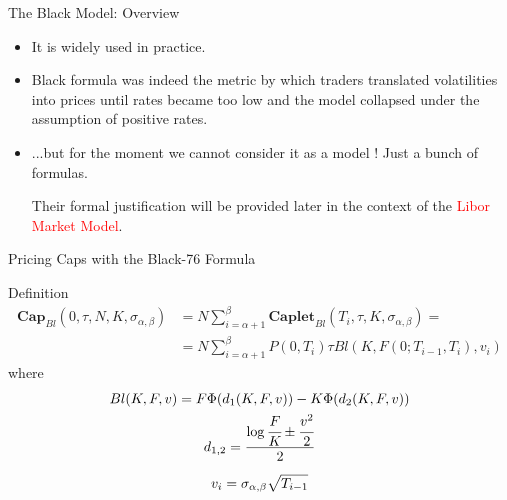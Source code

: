 \documentclass{beamer}
\begin{document}

\begin{frame}{The Black Model: Overview}
	\begin{itemize}
		\item It is widely used in practice. 
		\item Black formula was indeed the metric by which traders translated volatilities into prices until rates became too low and the model collapsed under the assumption of positive rates.
		\item ...but for the moment we cannot consider it as a model ! Just a bunch of formulas.
		
		Their formal justification will be provided later in the context of the \textcolor{red}{Libor Market Model}.
	\end{itemize}
\end{frame}

\begin{frame}{Pricing Caps with the Black-76 Formula}
	\begin{block}{Definition}
	\begin{equation}
		\begin{aligned}
		\textbf{Cap}_{Bl}(0, \tau,N,K,\sigma_{\alpha,\beta}) &= 		N\sum_{i=\alpha+1}^{\beta} \textbf{Caplet}_{Bl}(T_i, \tau,K,\sigma_{\alpha,\beta}) = \\ &=N\sum_{i=\alpha+1}^{\beta}P(0,T_i)\tau Bl(K,F(0;T_{i-1},T_i),v_i)
		\end{aligned}
		\label{eq:cap_black}
	\end{equation}
	where
	\begin{equation*}
		\begin{gathered}
			Bl(K,F,v)=F\Phi(d_1(K,F,v)) - K\Phi(d_2(K,F,v)) \\
			d_{1,2} = \frac{\log{\cfrac{F}{K}} \pm \cfrac{v^2}{2}}{2} \\[0.2cm]
			v_i = \sigma_{\alpha,\beta}\sqrt{T_{i-1}}	
		\end{gathered}
	\end{equation*}
	\end{block}
\end{frame}
\end{document}
